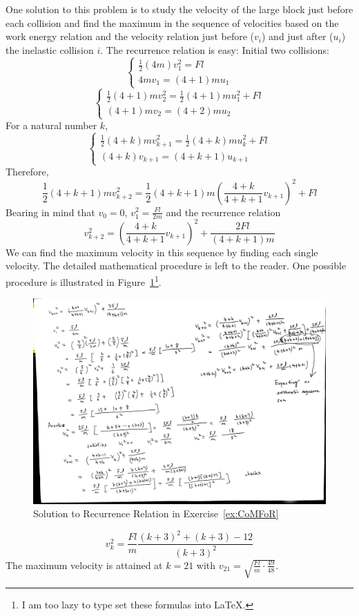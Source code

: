 \documentclass[a4paper,12pt,titlepage]{article}
\begin{document}
One solution to this problem is to study the velocity of the large block just before each collision and find the maximum in the sequence of velocities based on the work energy relation and the velocity relation just before ($v_i$) and just after ($u_i$) the inelastic collision $i$. The recurrence relation is easy: Initial two collisions:
\[
\begin{cases}
\frac{1}{2}(4m)v_1^2=Fl\\
4mv_1=(4+1)mu_1
\end{cases}
\]
\[
\begin{cases}
\frac{1}{2}(4+1)mv_2^2=\frac{1}{2}(4+1)mu_1^2+Fl\\
(4+1)mv_2=(4+2)mu_2
\end{cases}
\]
For a natural number $k$,
\[
\begin{cases}
\frac{1}{2}(4+k)mv_{k+1}^2=\frac{1}{2}(4+k)mu_{k}^2+Fl\\
(4+k)v_{k+1}=(4+k+1)u_{k+1}
\end{cases}
\]
Therefore,
\[\frac{1}{2}(4+k+1)mv_{k+2}^2=\frac{1}{2}(4+k+1)m\left(\frac{4+k}{4+k+1}v_{k+1}\right)^2+Fl\]
Bearing in mind that $v_0=0$, $v_1^2=\frac{Fl}{2m}$ and the recurrence relation
\[v_{k+2}^2=\left(\frac{4+k}{4+k+1}v_{k+1}\right)^2+\frac{2Fl}{(4+k+1)m}\]
We can find the maximum velocity in this sequence by finding each single velocity. The detailed mathematical procedure is left to the reader. One possible procedure is illustrated in Figure~\ref{fig:mymathematicalprocedure}\footnote{I am too lazy to type set these formulas into \LaTeX.}.
\begin{figure}[h]
\centering
\includegraphics[width=\textwidth]{Midterm2ReviewHandout_SequenceSol.JPG}
\caption{Solution to Recurrence Relation\label{fig:mymathematicalprocedure} in Exercise~\ref{ex:CoMFoR}}
\end{figure}
\[v_k^2=\frac{Fl}{m}\frac{(k+3)^2+(k+3)-12}{(k+3)^2}\]
The maximum velocity is attained at $k=21$ with $v_{21}=\sqrt{\frac{Fl}{m}\cdot\frac{49}{48}}$.
\end{document}
